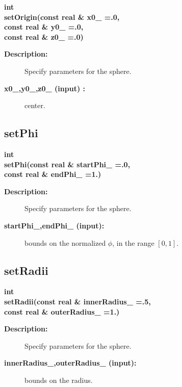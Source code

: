 \begin{flushleft} \textbf{%
int  \\ 
\settowidth{\SphereMappingIncludeArgIndent}{setOrigin(}%
setOrigin(const real \& x0\_  =.0, \\ 
\hspace{\SphereMappingIncludeArgIndent}const real \& y0\_  =.0, \\ 
\hspace{\SphereMappingIncludeArgIndent}const real \& z0\_  =.0)
}\end{flushleft}
\begin{description}
\item[{\bf Description:}]  
    Specify parameters for the sphere.
\item[{\bf x0\_,y0\_,z0\_ (input) :}]  center.
\end{description}
\subsection{setPhi}
 
\begin{flushleft} \textbf{%
int  \\ 
\settowidth{\SphereMappingIncludeArgIndent}{setPhi(}%
setPhi(const real \& startPhi\_  =.0,\\ 
\hspace{\SphereMappingIncludeArgIndent}const real \& endPhi\_    =1.)
}\end{flushleft}
\begin{description}
\item[{\bf Description:}]  
    Specify parameters for the sphere.
\item[{\bf startPhi\_,endPhi\_ (input):}]  bounds on the normalized $\phi$, in the range $[0,1]$.
\end{description}
\subsection{setRadii}
 
\begin{flushleft} \textbf{%
int  \\ 
\settowidth{\SphereMappingIncludeArgIndent}{setRadii(}%
setRadii(const real \& innerRadius\_  =.5, \\ 
\hspace{\SphereMappingIncludeArgIndent}const real \& outerRadius\_  =1.)
}\end{flushleft}
\begin{description}
\item[{\bf Description:}]  
    Specify parameters for the sphere.
\item[{\bf innerRadius\_,outerRadius\_ (input):}]  bounds on the radius.
\end{description}
